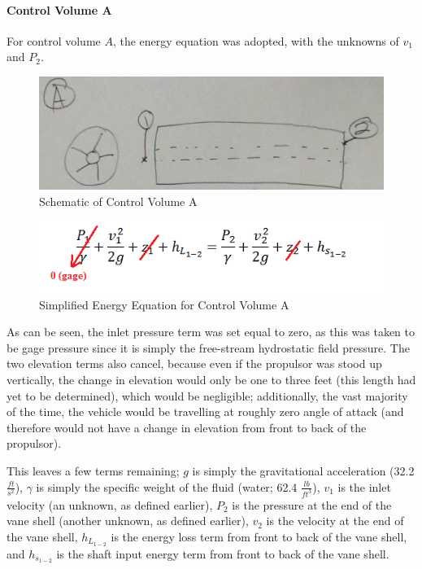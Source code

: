 \documentclass{report}
\begin{document}
\paragraph{Control Volume A}
For control volume $A$, the energy equation was adopted, with the unknowns of $v_1$ and $P_2$.
\begin{figure}[h]
\centering
\includegraphics{"Ctrl Volume A"}
\caption{Schematic of Control Volume A}
\end{figure}
\begin{figure}[h]
\centering
\includegraphics{"Eqn A"}
\caption{Simplified Energy Equation for Control Volume A}
\end{figure}
As can be seen, the inlet pressure term was set equal to zero, as this was taken to be gage pressure since it is simply the free-stream hydrostatic field pressure.  The two elevation terms also cancel, because even if the propulsor was stood up vertically, the change in elevation would only be one to three feet (this length had yet to be determined), which would be negligible; additionally, the vast majority of the time, the vehicle would be travelling at roughly zero angle of attack (and therefore would not have a change in elevation from front to back of the propulsor).\par
This leaves a few terms remaining; $g$ is simply the gravitational acceleration (32.2 $\frac{ft}{s^2}$), $\gamma$ is simply the specific weight of the fluid (water; 62.4 $\frac{lb}{ft^3}$), $v_1$ is the inlet velocity (an unknown, as defined earlier), $P_2$ is the pressure at the end of the vane shell (another unknown, as defined earlier), $v_2$ is the velocity at the end of the vane shell, $h_{L_{1-2}}$ is the energy loss term from front to back of the vane shell, and $h_{s_{1-2}}$ is the shaft input energy term from front to back of the vane shell.\par
\end{document}

